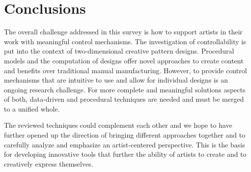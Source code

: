 

\section{Conclusions}
\label{sec:conclusion}


The overall challenge addressed in this survey is how to support artists in their work with meaningful control mechanisms. The investigation of controllability is put into the context of two-dimensional creative pattern designs. Procedural models and the computation of designs offer novel approaches to create content and benefits over traditional manual manufacturing. However, to provide control mechanisms that are intuitive to use and allow for individual designs is an ongoing research challenge. For more complete and meaningful solutions aspects of both, data-driven and procedural techniques are needed and must be merged to a unified whole.  

The reviewed techniques could complement each other and we hope to have further opened up the direction of bringing different approaches together and to carefully analyze and emphasize an artist-centered perspective. This is the basis for developing innovative tools that further the ability of artists to create and to creatively express themselves.



